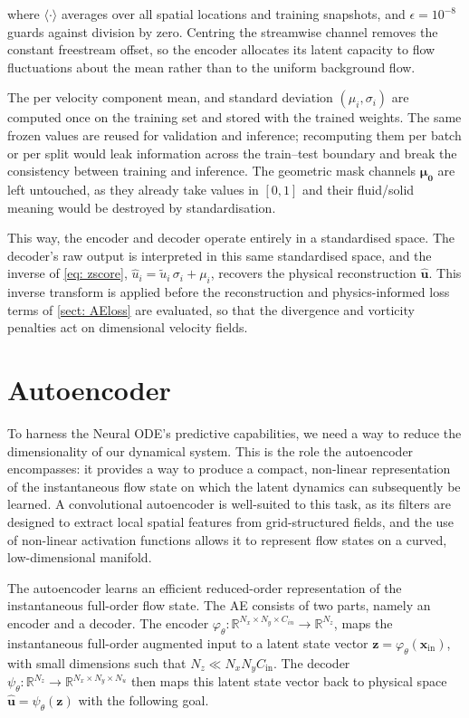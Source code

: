where $\langle \cdot \rangle$ averages over all spatial locations and training snapshots, and $\epsilon = 10^{-8}$ guards against division by zero. Centring the streamwise channel removes the constant freestream offset, so the encoder allocates its latent capacity to flow fluctuations about the mean rather than to the uniform background flow.

The per velocity component mean, and standard deviation $(\mu_i, \sigma_i)$ are computed once on the training set and stored with the trained weights. The same frozen values are reused for validation and inference; recomputing them per batch or per split would leak information across the train--test boundary and break the consistency between training and inference. The geometric mask channels $\boldsymbol{\mu_0}$ are left untouched, as they already take values in $[0,1]$ and their fluid/solid meaning would be destroyed by standardisation.

This way, the encoder and decoder operate entirely in a standardised space. The decoder's raw output is interpreted in this same standardised space, and the inverse of \autoref{eq: zscore}, $\hat{u}_i = \tilde{u}_i\,\sigma_i + \mu_i$, recovers the physical reconstruction $\hat{\mathbf{u}}$. This inverse transform is applied before the reconstruction and physics-informed loss terms of \autoref{sect: AEloss} are evaluated, so that the divergence and vorticity penalties act on dimensional velocity fields.

\section{Autoencoder}
\label{sect: AE}

To harness the Neural ODE's predictive capabilities, we need a way to reduce the dimensionality of our dynamical system. This is the role the autoencoder encompasses: it provides a way to produce a compact, non-linear representation of the instantaneous flow state on which the latent dynamics can subsequently be learned. A convolutional autoencoder is well-suited to this task, as its filters are designed to extract local spatial features from grid-structured fields, and the use of non-linear activation functions allows it to represent flow states on a curved, low-dimensional manifold. 

The autoencoder learns an efficient reduced-order representation of the instantaneous full-order flow state. The AE consists of two parts, namely an encoder and a decoder. The encoder $\varphi_\theta: \mathbb{R}^{N_x \times N_y \times C_{in}} \to \mathbb{R}^{N_z}$, maps the instantaneous full-order augmented input to a latent state vector $\mathbf{z} = \varphi_\theta(\mathbf{x}_\text{in})$, with small dimensions such that $N_z \ll N_x N_y C_\text{in}$. The decoder $\psi_\theta : \mathbb{R}^{N_z} \to \mathbb{R}^{N_x \times N_y \times N_u}$ then maps this latent state vector back to physical space $\hat{\mathbf{u}} = \psi_\theta(\mathbf{z})$ with the following goal.


